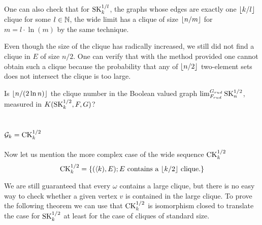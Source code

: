 One can also check that for $\text{SK}_{k}^{1/l}$, the graphs whose edges are exactly one $\left \lfloor {k/l} \right \rfloor$ clique for some $l\in \mathbb{N}$, the wide limit has a clique of size $\left \lfloor {n/m} \right \rfloor$ for $m=l\cdot \ln(m)$ by the same technique.

Even though the size of the clique has radically increased, we still did not find a clique in $E$ of size $n/2$. One can verify that with the method provided one cannot obtain such a clique because the probability that any of $\left \lfloor {n/2} \right \rfloor$ two-element sets does not intersect the clique is too large. 

\begin{ques}
Is $\left \lfloor {n/(2\ln n)} \right \rfloor$ the clique number in the Boolean valued graph $\lim_{F_{rud}}^{G_{rud}}\text{SK}_n^{1/2}$, measured in $K(\text{SK}_k^{1/2},F,G)$?
\end{ques}


\section{$\mathcal{G}_k=\text{CK}_k^{1/2}$}

Now let us mention the more complex case of the wide sequence $\text{CK}_k^{1/2}$
\[\text{CK}_k^{1/2}=\{(\langle k),E);E\text{ contains a $\left \lfloor {k/2} \right \rfloor$ clique.}\}\]

We are still guaranteed that every $\omega$ contains a large clique, but there is no easy way to check whether a given vertex $v$ is contained in the large clique. To prove the following theorem we can use that $\text{CK}_k^{1/2}$ is isomorphism closed to translate the case for $\text{SK}_k^{1/2}$ at least for the case of cliques of standard size.

